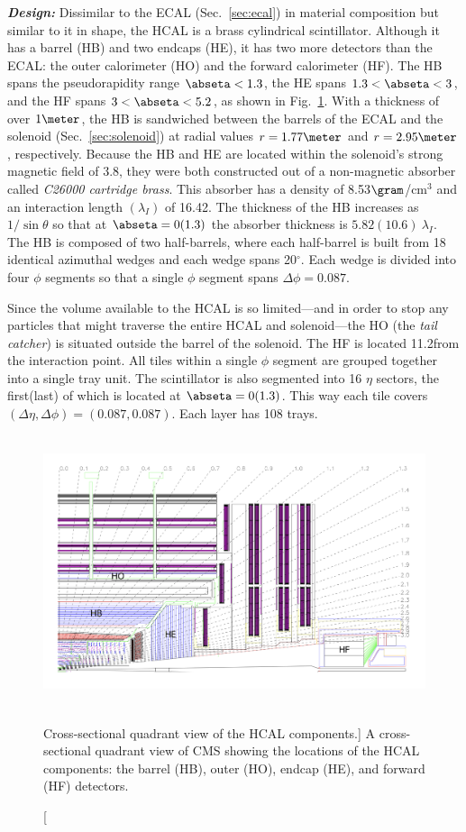 \textit{\textbf{Design:}}
Dissimilar to the ECAL (Sec.~\ref{sec:ecal}) in material composition but similar to it in shape, the HCAL is a brass cylindrical scintillator.
Although it has a barrel (HB) and two endcaps (HE), it has two more detectors than the ECAL: the outer calorimeter (HO) and the forward calorimeter (HF).
The HB spans the pseudorapidity range $\abseta < 1.3$, the HE spans $1.3 < \abseta < 3$, and the HF spans $3 < \abseta < 5.2$, as shown in Fig.~\ref{fig:hcal_quadrant}.
With a thickness of over $1\meter$, the HB is sandwiched between the barrels of the ECAL and the solenoid (Sec.~\ref{sec:solenoid}) at radial values $r = 1.77\meter$ and $r = 2.95\meter$, respectively.
Because the HB and HE are located within the solenoid's strong magnetic field of 3.8\tesla, they were both constructed out of a non-magnetic absorber called \emph{C26000 cartridge brass}.
This absorber has a density of 8.53$\gram$/cm$^{3}$ and an interaction length $(\lambda_I)$ of 16.42\cm.
The thickness of the HB increases as $1/\sin{\theta}$ so that at $\abseta = 0(1.3)$ the absorber thickness is $5.82(10.6)~\lambda_I$.
The HB is composed of two half-barrels, where each half-barrel is built from 18 identical azimuthal wedges and each wedge spans 20$^\circ$.
Each wedge is divided into four $\phi$ segments so that a single $\phi$ segment spans $\Delta \phi = 0.087$.

Since the volume available to the HCAL is so limited---and in order to stop any particles that might traverse the entire HCAL and solenoid---the HO (the \emph{tail catcher}) is situated outside the barrel of the solenoid.
The HF is located 11.2\meter from the interaction point.
All tiles within a single $\phi$ segment are grouped together into a single tray unit.
The scintillator is also segmented into 16 $\eta$ sectors, the first(last) of which is located at $\abseta = 0(1.3)$.
This way each tile covers $(\Delta \eta, \Delta \phi) = (0.087, 0.087)$.
Each layer has 108 trays.
\begin{figure}[h]
    \centering
    \includegraphics[height=8cm]{figures/cms/hcal/hcal_quadrants_longitudinalview.jpg}
    \caption
        [Cross-sectional quadrant view of the HCAL components.]
        {
        A cross-sectional quadrant view of CMS showing the locations of the HCAL components:
        the barrel (HB), outer (HO), endcap (HE), and forward (HF) detectors.
        }
    \label{fig:hcal_quadrant}
\end{figure}

